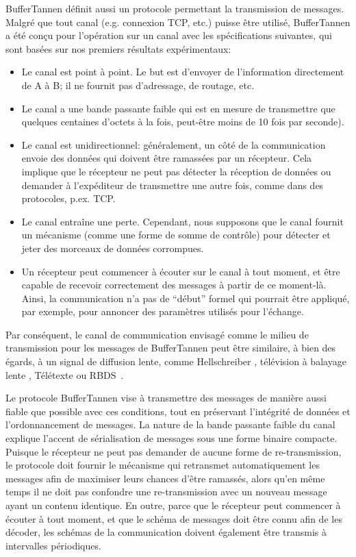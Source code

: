 BufferTannen définit aussi un protocole permettant la transmission de messages. Malgré que tout canal (e.g. connexion TCP, etc.) puisse être utilisé, BufferTannen a été conçu pour l'opération sur un canal avec les spécifications suivantes, qui sont basées sur nos premiers résultats expérimentaux:

\begin{itemize}
\item Le canal est point à point. Le but est d'envoyer de l'information directement de A à B; il ne fournit pas d'adressage, de routage, etc.
\item Le canal a une bande passante faible qui est en mesure de transmettre que quelques centaines d'octets à la fois, peut-être moins de 10 fois par seconde).
\item Le canal est unidirectionnel: généralement, un côté de la communication envoie des données qui doivent être ramassées par un récepteur. Cela implique que le récepteur ne peut pas détecter la réception de données ou demander à l'expéditeur de transmettre une autre fois, comme dans des protocoles, p.ex. TCP.
\item Le canal entraîne une perte. Cependant, nous supposons que le canal fournit un mécanisme (comme une forme de somme de contrôle) pour détecter et jeter des morceaux de données corrompues.
\item Un récepteur peut commencer à écouter sur le canal à tout moment, et être capable de recevoir correctement des messages à partir de ce moment-là. Ainsi, la communication n'a pas de ``début'' formel qui pourrait être appliqué, par exemple, pour annoncer des paramètres utilisés pour l'échange.
\end{itemize}

Par conséquent, le canal de communication envisagé comme le milieu de transmission pour les messages de BufferTannen peut être similaire, à bien des égards, à un signal de diffusion lente, comme Hellschreiber \citep{hells}, télévision à balayage lente \citep{slowtv}, Télétexte \citep{teletext} ou RBDS~\citep{rbds}.

Le protocole BufferTannen vise à transmettre des messages de manière aussi fiable que possible avec ces conditions, tout en préservant l'intégrité de données et l'ordonnancement de messages. La nature de la bande passante faible du canal explique l'accent de sérialisation de messages sous une forme binaire compacte. Puisque le récepteur ne peut pas demander de aucune forme de re-transmission, le protocole doit fournir le mécanisme qui retransmet automatiquement les messages afin de maximiser leurs chances d'être ramassés, alors qu'en même temps il ne doit pas confondre une re-transmission avec un nouveau message ayant un contenu identique. En outre, parce que le récepteur peut commencer à écouter à tout moment, et que le schéma de messages doit être connu afin de les décoder, les schémas de la communication doivent également être transmis à intervalles périodiques.

